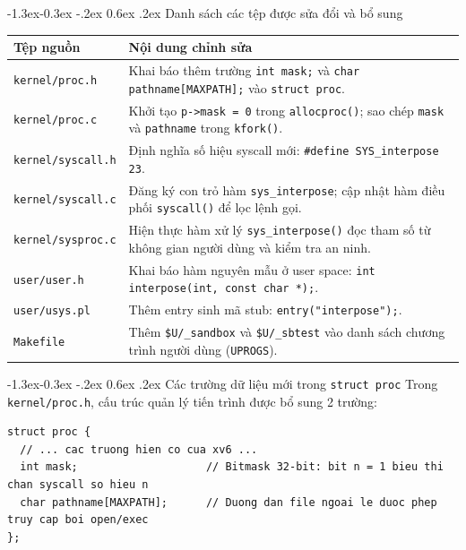 \documentclass[11pt,a4paper]{article}
\makeatletter
\renewcommand\subsection{\@startsection{subsection}{2}{\z@}%
                                     {-1.3ex\@plus -0.3ex \@minus -.2ex}%
                                     {0.6ex \@plus .2ex}%
                                     {\normalfont\normalsize\bfseries}}
\makeatother
\begin{document}
\subsection{Danh sách các tệp được sửa đổi và bổ sung}
\begin{table}[H]
\centering
\small
\begin{tabular}{p{3.2cm}p{12.3cm}}
\toprule
\textbf{Tệp nguồn} & \textbf{Nội dung chỉnh sửa} \\
\midrule
\texttt{kernel/proc.h} & Khai báo thêm trường \texttt{int mask;} và \texttt{char pathname[MAXPATH];} vào \texttt{struct proc}. \\
\texttt{kernel/proc.c} & Khởi tạo \texttt{p->mask = 0} trong \texttt{allocproc()}; sao chép \texttt{mask} và \texttt{pathname} trong \texttt{kfork()}. \\
\texttt{kernel/syscall.h} & Định nghĩa số hiệu syscall mới: \texttt{\#define SYS\_interpose 23}. \\
\texttt{kernel/syscall.c} & Đăng ký con trỏ hàm \texttt{sys\_interpose}; cập nhật hàm điều phối \texttt{syscall()} để lọc lệnh gọi. \\
\texttt{kernel/sysproc.c} & Hiện thực hàm xử lý \texttt{sys\_interpose()} đọc tham số từ không gian người dùng và kiểm tra an ninh. \\
\texttt{user/user.h} & Khai báo hàm nguyên mẫu ở user space: \texttt{int interpose(int, const char *);}. \\
\texttt{user/usys.pl} & Thêm entry sinh mã stub: \texttt{entry("interpose");}. \\
\texttt{Makefile} & Thêm \texttt{\$U/\_sandbox} và \texttt{\$U/\_sbtest} vào danh sách chương trình người dùng (\texttt{UPROGS}). \\
\bottomrule
\end{tabular}
\end{table}

\subsection{Các trường dữ liệu mới trong \texttt{struct proc}}
Trong \texttt{kernel/proc.h}, cấu trúc quản lý tiến trình được bổ sung 2 trường:
\begin{lstlisting}[style=cstyle]
struct proc {
  // ... cac truong hien co cua xv6 ...
  int mask;                    // Bitmask 32-bit: bit n = 1 bieu thi chan syscall so hieu n
  char pathname[MAXPATH];      // Duong dan file ngoai le duoc phep truy cap boi open/exec
};
\end{lstlisting}
\end{document}
